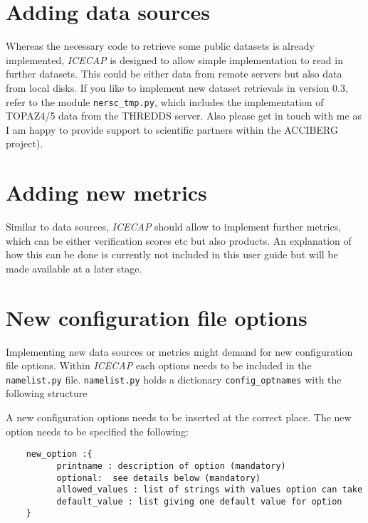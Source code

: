 \documentclass[DIV=10, parskip=full]{scrreprt}
\newcommand{\ice}{\textit{ICECAP}\xspace}
\newcommand{\version}{0.3\xspace}
\newcommand{\notimplement}[1]{#1}
\begin{document}
\section{Adding data sources}
Whereas the necessary code to retrieve some public datasets is already implemented, \ice is designed to allow simple implementation to read in further datasets. This could be either data from remote servers but also data from local disks. \notimplement{If you like to implement new dataset retrievals in version \version, refer to the module \texttt{nersc\_tmp.py}, which includes the implementation of TOPAZ4/5 data from the THREDDS server. Also please get in touch with me as I am happy to provide support to scientific partners within the ACCIBERG project).}

\section{Adding new metrics}
Similar to data sources, \ice should allow to implement further metrics, which can be either verification scores etc but also products. An explanation of how this can be done is currently \notimplement{not included in this user guide but will be made available at a later stage}. \\

\section{New configuration file options}
Implementing new data sources or metrics might demand for new configuration file options. Within \ice each options needs to be included in the \texttt{namelist.py} file.   \texttt{namelist.py} holds a dictionary \texttt{config\_optnames} with the following structure\\


A new configuration options needs to be inserted at the correct place. The new option needs to be specified the following:\\
\begin{verbatim}
	new_option :{
	      printname : description of option (mandatory)
	      optional:  see details below (mandatory)
	      allowed_values : list of strings with values option can take
	      default_value : list giving one default value for option
	}
\end{verbatim}
\end{document}
